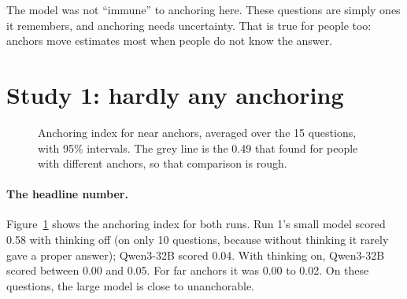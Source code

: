 \documentclass[11pt,a4paper]{article}
\begin{document}
The model was not \enquote{immune} to anchoring here. These questions are simply ones it remembers, and anchoring needs uncertainty. That is true for people too: anchors move estimates most when people do not know the answer.

\section{Study 1: hardly any anchoring}

\begin{figure}[ht]
\centering
{}
\caption{Anchoring index for near anchors, averaged over the 15 questions, with 95\% intervals. The grey line is the 0.49 that \citet{jacowitz1995measures} found for people with different anchors, so that comparison is rough.}
\label{fig:index}
\end{figure}

\paragraph{The headline number.} Figure~\ref{fig:index} shows the anchoring index for both runs. Run 1's small model scored 0.58 with thinking off (on only 10 questions, because without thinking it rarely gave a proper answer); Qwen3-32B scored 0.04. With thinking on, Qwen3-32B scored between 0.00 and 0.05. For far anchors it was 0.00 to 0.02. On these questions, the large model is close to unanchorable.
\end{document}
